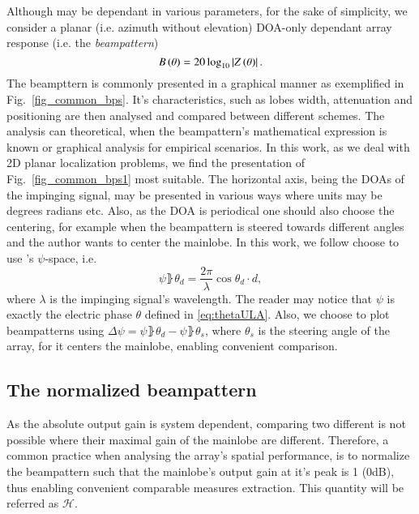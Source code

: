 Although may be dependant in various parameters, for the sake of simplicity, we consider a planar (i.e. azimuth without elevation) DOA-only dependant array response (i.e. the \emph{beampattern})
\begin{equation}
B\left({\theta}\right) = 20\log_{10}\left\vert Z\left({\theta}\right)\right\vert.
\end{equation}
The beampttern is commonly presented in a graphical manner as exemplified in Fig.~\ref{fig_common_bps}.
It's characteristics, such as lobes width, attenuation and positioning are then analysed and compared between different schemes.
The analysis can theoretical, when the beampattern's mathematical expression is known or graphical analysis for empirical scenarios.
In this work, as we deal with 2D planar localization problems, we find the presentation of Fig.~\ref{fig_common_bps1} most suitable.
The horizontal axis, being the DOAs of the impinging signal, may be presented in various ways where units may be degrees radians etc.
Also, as the DOA is periodical one should also choose the centering, for example when the beampattern is steered towards different angles and the author wants to center the mainlobe.
In this work, we follow choose to use \cite{van2004optimum}'s $\psi$-space, i.e.
\begin{equation}
    \psi\rBrace{\theta_{d}}=\frac{2\pi}{\lambda}\cos{\theta_{d}}\cdot{}d,
\end{equation}
where $\lambda$ is the impinging signal's wavelength.
The reader may notice that $\psi$ is exactly the electric phase $\theta$ defined in \eqref{eq:thetaULA}. 
Also, we choose to plot beampatterns using $\Delta\psi = \psi\rBrace{\theta_{d}} - \psi\rBrace{\theta_{s}}$, where $\theta_{s}$ is the steering angle of the array, for it centers the mainlobe, enabling convenient comparison.
\subsection{The normalized beampattern}
As the absolute output gain is system dependent, comparing two different is not possible where their maximal gain of the mainlobe are different.
Therefore, a common practice \cite{van2004optimum} when analysing the array's spatial performance, is to normalize the beampattern such that the mainlobe's output gain at it's peak is 1 (0dB), thus enabling convenient comparable measures extraction.
This quantity will be referred as $\mathcal{H}$.
